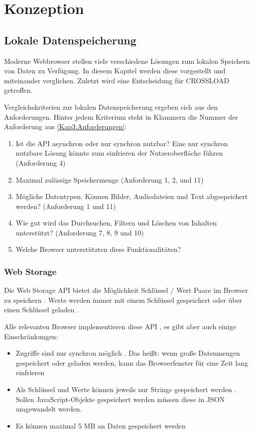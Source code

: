 \chapter{Konzeption}
\label{Kap4}

\section{Lokale Datenspeicherung}
Moderne Webbrowser stellen viele verschiedene Lösungen zum lokalen Speichern von Daten zu Verfügung. In diesem Kapitel werden diese vorgestellt und miteinander verglichen. Zuletzt wird eine Entscheidung für CROSSLOAD getroffen.

Vergleichskriterien zur lokalen Datenspeicherung ergeben sich aus den Anforderungen. Hinter jedem Kriterium steht in Klammern die Nummer der Anforderung aus \autoref{Kap3:Anforderungen}:
\begin{enumerate}
	\item Ist die \ac{API} asynchron oder nur synchron nutzbar? Eine nur synchron nutzbare Lösung könnte zum einfrieren der Nutzeroberfläche führen (Anforderung 4)
	\item Maximal zulässige Speichermenge (Anforderung 1, 2, und 11)
	\item Mögliche Datentypen. Können Bilder, Audiodateien und Text abgespeichert werden? (Anforderung 1 und 11)
	\item Wie gut wird das Durchsuchen, Filtern und Löschen von Inhalten unterstützt? (Anforderung 7, 8, 9 und 10)
	\item Welche Browser unterstützten diese Funktionalitäten?
\end{enumerate}

\subsection{Web Storage}
Die Web Storage \ac{API} bietet die Möglichkeit Schlüssel / Wert Paare im Browser zu speichern \autocite{mdn-web-storage}. Werte werden immer mit einem Schlüssel gespeichert oder über einen Schlüssel geladen \autocite{mdn-web-storage}.

Alle relevanten Browser implementieren diese \ac{API} \autocite{mdn-web-storage}, es gibt aber auch einige Einschränkungen:
\begin{itemize}
	\item Zugriffe sind nur synchron möglich \autocite{Hajian2019}. Das heißt: wenn große Datenmengen gespeichert oder geladen werden, kann das Browserfenster für eine Zeit lang einfrieren
	\item Als Schlüssel und Werte können jeweils nur Strings gespeichert werden \autocite{Hajian2019}. Sollen JavaScript-Objekte gespeichert werden müssen diese in JSON umgewandelt werden.
	\item Es können maximal 5 \ac{MB} an Daten gespeichert werden \autocite{mdn-web-storage}
\end{itemize}

